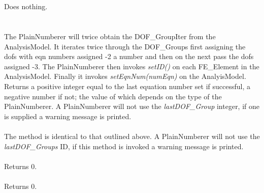  \\
\\ 
Does nothing. \\

\\
 \\
The PlainNumberer will twice obtain the DOF\_GroupIter from the
AnalysisModel. It iterates twice through the DOF\_Groups first
assigning the dofs with eqn numbers assigned -2 a number and 
then on the next pass the dofs assigned -3. The PlainNumberer then
invokes {\em setID()} on each FE\_Element in the
AnalysisModel. Finally it invokes {\em setEqnNum(numEqn)} on the
AnalyisModel. Returns a positive integer equal to the last equation
number set if successful, a negative number if not; the value of 
which depends on the type of the PlainNumberer. A PlainNumberer will
not use the {\em lastDOF\_Group} integer, if one is supplied a warning
message is printed. \\ 

 \\
The method is identical to that outlined above. A PlainNumberer will
not use the {\em lastDOF\_Groups} ID, if this method is invoked a warning
message is printed. \\ 


\\ 
Returns $0$. \\

\\
Returns $0$.





